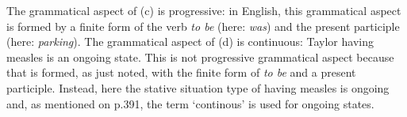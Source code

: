 \documentclass[a4,11pt]{article}
\newcommand{\6}{\mbox{$[\hspace*{-.6mm}[$}}
\newcommand{\9}{\mbox{$]\hspace*{-.6mm}]$}}
\begin{document}
\begin{enumerate}[leftmargin = 12pt]
The grammatical aspect of (c) is progressive: in English, this grammatical aspect is formed by a finite form of the verb {\em to be} (here: {\em was}) and the present participle (here: {\em parking}). The grammatical aspect of (d) is continuous: Taylor having measles is an ongoing state. This is not progressive grammatical aspect because that is formed, as just noted, with the finite form of {\em to be} and a present participle. Instead, here the stative situation type of having measles is ongoing and, as mentioned on p.391, the term `continous' is used for ongoing states.

\end{enumerate}
\end{document}
